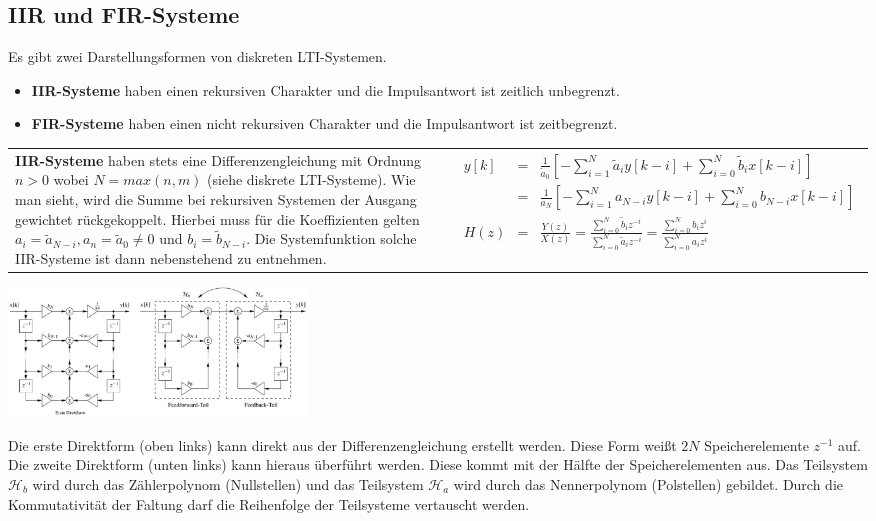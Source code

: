 \begin{multicols}{2}
\subsection{IIR und FIR-Systeme}
Es gibt zwei Darstellungsformen von diskreten LTI-Systemen.
\begin{itemize}
\item \textbf{IIR-Systeme} haben einen rekursiven Charakter und die Impulsantwort ist zeitlich unbegrenzt.
\item \textbf{FIR-Systeme} haben einen nicht rekursiven Charakter und die Impulsantwort ist zeitbegrenzt.
\end{itemize}
\begin{tabular}{ll}
 \addtolength{\jot}{2mm}
 \parbox{4cm}{\textbf{IIR-Systeme} haben stets eine Differenzengleichung mit Ordnung $n>0$ wobei  $N = max(n,m)$ (siehe diskrete LTI-Systeme). Wie man sieht, wird die Summe bei rekursiven Systemen der Ausgang gewichtet rückgekoppelt. Hierbei muss für die Koeffizienten gelten $a_i = \tilde{a}_{N-i}, a_n = \tilde{a}_0 \neq 0$ und $b_i = \tilde{b}_{N-i}$. Die Systemfunktion solche IIR-Systeme ist dann nebenstehend zu entnehmen.}
 &
 \addtolength{\jot}{2mm}
 \parbox{7cm}{
\begin{eqnarray*}
 y[k] &=& \frac{1}{\tilde{a}_0} \left[  - \sum_{i=1}^N \tilde{a}_i y[k-i] + \sum_{i=0}^N \tilde{b}_i x[k-i]\right]\\
 &=& \frac{1}{a_N} \left[  - \sum_{i=1}^N a_{N-i} y[k-i] + \sum_{i=0}^N b_{N-i} x[k-i]\right]\\
 H(z) &=& \frac{Y(z)}{X(z)} = \frac{\sum\limits_{i=0}^N \tilde{b}_i z^{-i}}{\sum\limits_{i=0}^N \tilde{a}_i z^{-i}} = \frac{\sum\limits_{i=0}^N b_i z^{i}}{\sum\limits_{i=0}^N a_i z^{i}}
\end{eqnarray*}}
\end{tabular}
\begin{center}
\includegraphics[width=0.35\textwidth]{img/IIR-System_1.jpg}
\end{center}
Die erste Direktform (oben links) kann direkt aus der Differenzengleichung erstellt werden. Diese Form weißt $2N$ Speicherelemente $z^{-1}$ auf. Die zweite Direktform (unten links) kann hieraus überführt werden. Diese kommt mit der Hälfte der Speicherelementen aus. Das Teilsystem $\mathcal{H}_b$ wird durch das Zählerpolynom (Nullstellen) und das Teilsystem  $\mathcal{H}_a$ wird durch das Nennerpolynom (Polstellen) gebildet. Durch die Kommutativität der Faltung darf die Reihenfolge der Teilsysteme vertauscht werden.

\end{multicols}
